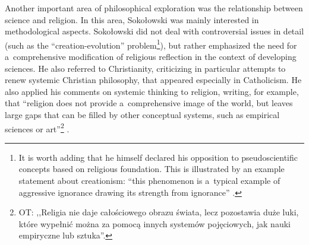 Another important area of philosophical exploration was the relationship between science and religion. In this area, Sokołowski was mainly interested in methodological aspects. Sokołowski did not deal with controversial issues in detail (such as the ``creation-evolution'' problem\footnote{It is worth adding that he himself declared his opposition to pseudoscientific concepts based on religious foundation. This is illustrated by an example statement about creationism: ``this phenomenon is a~typical example of aggressive ignorance drawing its strength from ignorance'' 
\parencite[][pp.259–260]{}.%
}), but rather emphasized the need for a~comprehensive modification of religious reflection in the context of developing sciences. He also referred to Christianity, criticizing in particular attempts to renew systemic Christian philosophy, that appeared especially in Catholicism. He also applied his comments on systemic thinking to religion, writing, for example, that ``religion does not provide a~comprehensive image of the world, but leaves large gaps that can be filled by other conceptual systems, such as empirical sciences or art''\footnote{OT: ,,Religia nie daje całościowego obrazu świata, lecz pozostawia duże luki, które wypełnić można za pomocą innych systemów pojęciowych, jak nauki empiryczne lub sztuka''.} 
\parencite[][p.199]{}.%




